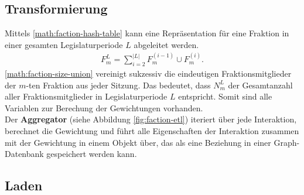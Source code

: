 \subsection{Transformierung}
Mittels \ref{math:faction-hash-table} kann eine Repräsentation für eine Fraktion in einer gesamten Legislaturperiode $L$ abgeleitet werden.
\begin{equation}
    \begin{aligned}
    \label{math:faction-size-union}
    F_{m}^{L} = \sum_{i = 2}^{|L|} F_{m}^{(i-1)} \cup F_{m}^{(i)}.
    \end{aligned}
\end{equation}
\ref{math:faction-size-union} vereinigt sukzessiv die eindeutigen Fraktionsmitglieder der $m$-ten Fraktion aus jeder Sitzung. Das bedeutet, dass $N_m^{L}$ der Gesamtanzahl
aller Fraktionsmitglieder in Legislaturperiode $L$ entspricht. Somit sind alle Variablen zur Berechung der Gewichtungen vorhanden.\\
Der \textbf{Aggregator} (siehe Abbildung \ref{fig:faction-etl}) iteriert über jede Interaktion, berechnet die Gewichtung und führt alle Eigenschaften der
Interaktion zusammen mit der Gewichtung in einem Objekt über, das als eine Beziehung in einer Graph-Datenbank gespeichert werden kann. 
\\
\subsection{Laden}
